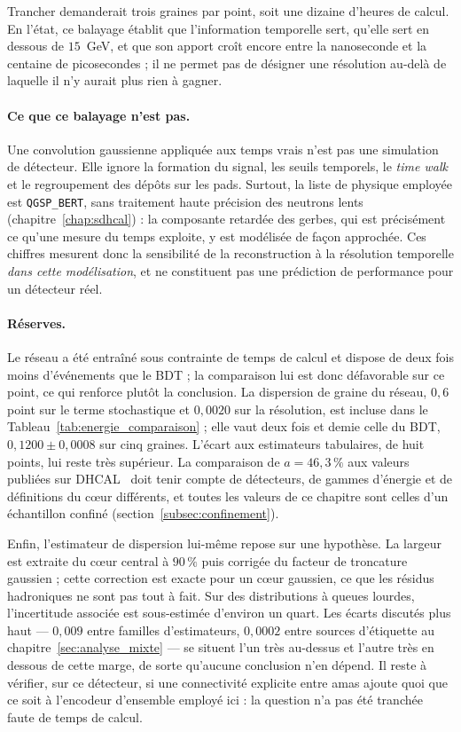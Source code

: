 Trancher demanderait trois graines par point, soit une dizaine d'heures de calcul. En l'état, ce balayage établit que l'information temporelle sert, qu'elle sert en dessous de $15$~GeV, et que son apport croît encore entre la nanoseconde et la centaine de picosecondes ; il ne permet pas de désigner une résolution au-delà de laquelle il n'y aurait plus rien à gagner.

\paragraph{Ce que ce balayage n'est pas.} Une convolution gaussienne appliquée aux temps vrais n'est pas une simulation de détecteur. Elle ignore la formation du signal, les seuils temporels, le \emph{time walk} et le regroupement des dépôts sur les pads. Surtout, la liste de physique employée est \texttt{QGSP\_BERT}, sans traitement haute précision des neutrons lents (chapitre~\ref{chap:sdhcal}) : la composante retardée des gerbes, qui est précisément ce qu'une mesure du temps exploite, y est modélisée de façon approchée. Ces chiffres mesurent donc la sensibilité de la reconstruction à la résolution temporelle \emph{dans cette modélisation}, et ne constituent pas une prédiction de performance pour un détecteur réel.

\paragraph{Réserves.} Le réseau a été entraîné sous contrainte de temps de calcul et dispose de deux fois moins d'événements que le BDT ; la comparaison lui est donc défavorable sur ce point, ce qui renforce plutôt la conclusion. La dispersion de graine du réseau, $0{,}6$ point sur le terme stochastique et $0{,}0020$ sur la résolution, est incluse dans le Tableau~\ref{tab:energie_comparaison} ; elle vaut deux fois et demie celle du BDT, $0{,}1200 \pm 0{,}0008$ sur cinq graines. L'écart aux estimateurs tabulaires, de huit points, lui reste très supérieur. La comparaison de $a = 46{,}3\,\%$ aux valeurs publiées sur DHCAL~\cite{borysova2025dhcalgnn} doit tenir compte de détecteurs, de gammes d'énergie et de définitions du c\oe{}ur différents, et toutes les valeurs de ce chapitre sont celles d'un échantillon confiné (section~\ref{subsec:confinement}).

Enfin, l'estimateur de dispersion lui-même repose sur une hypothèse. La largeur est extraite du c\oe{}ur central à $90\,\%$ puis corrigée du facteur de troncature gaussien ; cette correction est exacte pour un c\oe{}ur gaussien, ce que les résidus hadroniques ne sont pas tout à fait. Sur des distributions à queues lourdes, l'incertitude associée est sous-estimée d'environ un quart. Les écarts discutés plus haut — $0{,}009$ entre familles d'estimateurs, $0{,}0002$ entre sources d'étiquette au chapitre~\ref{sec:analyse_mixte} — se situent l'un très au-dessus et l'autre très en dessous de cette marge, de sorte qu'aucune conclusion n'en dépend. Il reste à vérifier, sur ce détecteur, si une connectivité explicite entre amas ajoute quoi que ce soit à l'encodeur d'ensemble employé ici : la question n'a pas été tranchée faute de temps de calcul.

